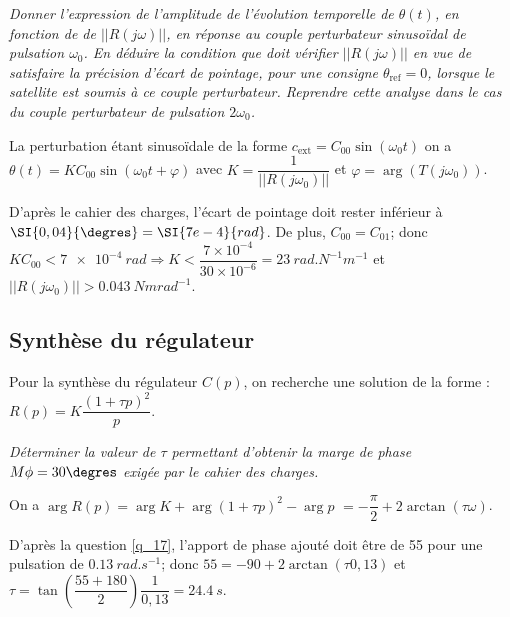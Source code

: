 \question{\label{q_20}}\textit{Donner l’expression de l’amplitude de  l'évolution temporelle de $\theta(t)$, en fonction de 
de $|| R\left(j \omega\right)||$,  en réponse
au couple perturbateur sinusoïdal de pulsation $\omega_0$. En déduire la condition que doit vérifier $|| R\left(j \omega\right)||$ en vue de
satisfaire la précision d’écart de pointage, pour une consigne $\theta_{\text{ref}} = 0$, lorsque le satellite est soumis à ce couple
perturbateur. Reprendre cette analyse dans le cas du couple 
perturbateur de pulsation $2\omega_0$.}
\ifprof
\begin{corrige}
La perturbation étant sinusoïdale de la forme 
$c_{\text{ext}} = C_{00}\sin(\omega_0 t)$ on a 
$\theta(t)=K C_{00}\sin(\omega_0 t + \varphi)$ avec 
$K = \dfrac{1}{|| R\left(j\omega_0\right)||} $ et 
$\varphi = \arg\left( T(j\omega_0) \right)$.

D'après le cahier des charges, l'écart de pointage doit rester inférieur à $\SI{0,04}{\degres} = \SI{7e-4}{rad}$.
De plus, $C_{00}=C_{01}$; donc $K C_{00} <  \SI{7e-4}{rad} \Rightarrow K < \dfrac{7\times 10^{-4}}{30\times 10^{-6}} = \SI{23}{rad.N^{-1}m^{-1}}$ et $|| R\left(j\omega_0\right)|| > \SI{0,043}{Nmrad^{-1}}$.

\end{corrige}

\else
\fi

\subsection{\label{sec:3:C} Synthèse du régulateur}

Pour la synthèse du régulateur $C(p)$, on recherche une solution de la forme : $R(p)=K \dfrac{\left(1+\tau p\right)^2}{p}$.

\question{\label{q_21}}\textit{Déterminer la valeur de
$\tau$  permettant d’obtenir 
la marge de phase 
$M \phi = 30\degres$
 exigée par le cahier des charges.}
\ifprof
\begin{corrige}
On a $\arg{R(p)} = \arg{K}+ \arg{\left(1+\tau p\right)^2} - \arg{p}$
$ =-\dfrac{\pi}{2}  +2 \arctan\left(\tau \omega \right)$.

D'après la question \ref{q_17}, l'apport de phase ajouté doit être de \SI{55}{\degres} pour une pulsation de $ \SI{0,13}{rad.s^{-1}}$; donc $55=-90  +2 \arctan\left(\tau 0,13 \right) $ et $\tau = \tan \left(\dfrac{55+180}{2}\right) \dfrac{1}{0,13} = \SI{24,4}{s}$.
\end{corrige}
\else
\fi 



